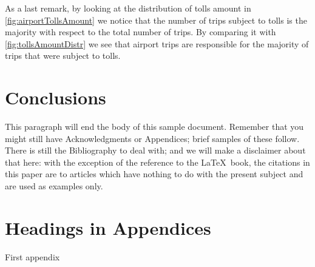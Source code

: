\documentclass{acm_proc_article-sp-sigmod09}
\begin{document}
As a last remark, by looking at the distribution of tolls amount in \cref{fig:airportTollsAmount} we notice that the number of trips subject to tolls is the majority with respect to the total number of trips. By comparing it with \cref{fig:tollsAmountDistr} we see that airport trips are responsible for the majority of trips that were subject to tolls.

\section{Conclusions}
This paragraph will end the body of this sample document.
Remember that you might still have Acknowledgments or
Appendices; brief samples of these
follow.  There is still the Bibliography to deal with; and
we will make a disclaimer about that here: with the exception
of the reference to the \LaTeX\ book, the citations in
this paper are to articles which have nothing to
do with the present subject and are used as
examples only.


%




\balancecolumns
\appendix
\section{Headings in Appendices}
First appendix
\end{document}
